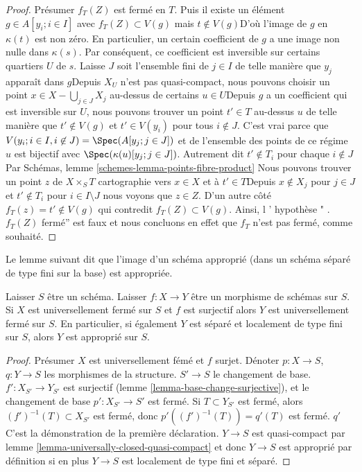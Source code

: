 \begin{proof}
Présumer $f_T(Z)$ est fermé en $T$. Puis il existe un élément
$g \in A[y_i; i \in I]$ avec $f_T(Z) \subset V(g)$ mais $t \not \in V(g)$D'où l'image de $g$ en $\kappa(t)$ est non zéro. En particulier, un certain coefficient de $g$ a une image non nulle dans $\kappa(s)$. Par conséquent, ce coefficient est inversible sur certains quartiers $U$ de $s$. Laisse $J$ soit l'ensemble fini de
$j \in I$ de telle manière que $y_j$ apparaît dans $g$Depuis $X_U$ n'est pas quasi-compact, nous pouvons choisir un point $x \in X - \bigcup_{j \in J} X_j$ au-dessus de certains
$u \in U$Depuis $g$ a un coefficient qui est inversible sur $U$, nous pouvons trouver un point $t' \in T$ au-dessus $u$ de telle manière que $t' \not \in V(g)$ et
$t' \in V(y_i)$ pour tous $i \notin J$. C'est vrai parce que
$V(y_i; i \in I, i \not\in J) = \Spec(A[y_j; j\in J])$
et de l'ensemble des points de ce régime $u$ est bijectif avec $\Spec(\kappa(u)[y_j; j \in J])$. Autrement dit $t' \notin T_i$
pour chaque $i \notin J$Par Schémas, lemme \ref{schemes-lemma-points-fibre-product}
Nous pouvons trouver un point $z$ de $X \times_S T$ cartographie vers $x \in X$ et à
$t' \in T$Depuis $x \not \in X_j$ pour $j \in J$ et $t' \not \in T_i$
pour $i \in I \setminus J$ nous voyons que $z \in Z$. D'un autre côté
$f_T(z) = t' \not \in V(g)$ qui contredit $f_T(Z) \subset V(g)$. Ainsi, l ' hypothèse " .$f_T(Z)$ fermé'' est faux et nous concluons en effet que $f_T$ n'est pas fermé, comme souhaité.

\end{proof}

\noindent
Le lemme suivant dit que l'image d'un schéma approprié (dans un schéma séparé de type fini sur la base) est appropriée.

\begin{lemma}

\label{lemma-image-proper-is-proper}
Laisser $S$ être un schéma. Laisser $f : X \to Y$ être un morphisme de schémas sur $S$. Si $X$ est universellement fermé sur $S$ et $f$ est surjectif alors $Y$ est universellement fermé sur $S$. En particulier, si également $Y$ est séparé et localement de type fini sur $S$, alors $Y$ est approprié sur $S$.
\end{lemma}

\begin{proof}

Présumer $X$ est universellement fémé et $f$ surjet. Dénoter $p : X \to S$, $q : Y \to S$ les morphismes de la structure. $S' \to S$ le changement de base.
$f' : X_{S'} \to Y_{S'}$ est surjectif (lemme \ref{lemma-base-change-surjective}), et le changement de base $p' : X_{S'} \to S'$ est fermé. Si $T \subset Y_{S'}$ est fermé, alors $(f')^{-1}(T) \subset X_{S'}$
est fermé, donc $p'((f')^{-1}(T)) = q'(T)$ est fermé. $q'$ C'est la démonstration de la première déclaration. $Y \to S$ est quasi-compact par lemme \ref{lemma-universally-closed-quasi-compact}
et donc $Y \to S$ est approprié par définition si en plus $Y \to S$ est localement de type fini et séparé.

\end{proof}

